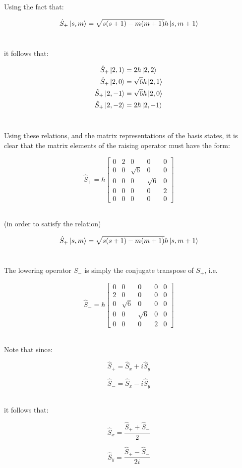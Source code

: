 \documentclass[9pt]{extarticle}
\begin{document}
\begin{multicols*}{2}
Using the fact that:

$$\hat S_+ \ket{s,m} = \sqrt{s(s+1) - m(m+1)} \hbar \ket{s,m+1}$$ \ 

it follows that:

$$
\begin{aligned}
	\hat S_+ \ket{2,1} &= 2 \hbar \ket{2,2} \\ 
	\hat S_+ \ket{2,0} &= \sqrt 6 \hbar \ket{2,1} \\ 
	\hat S_+ \ket{2,-1} &= \sqrt 6 \hbar \ket{2,0} \\ 
	\hat S_+ \ket{2,-2} &= 2 \hbar \ket{2,-1}
\end{aligned}
$$ \ 

Using these relations, and the matrix representations of the basis states, it is clear that the matrix elements of the raising operator must have the form:

$$
\hat S_+ = \hbar 
\begin{bmatrix}
	0 & 2 & 0 & 0 & 0 \\ 
	0 & 0 & \sqrt 6 & 0 & 0 \\ 
	0 & 0 & 0 & \sqrt 6 & 0 \\ 
	0 & 0 & 0 & 0 & 2 \\ 
	0 & 0 & 0 & 0 & 0
\end{bmatrix}
$$ \ 

(in order to satisfy the relation)

$$\hat S_+ \ket{s,m} = \sqrt{s(s+1) - m(m+1)} \hbar \ket{s,m+1}$$ \

The lowering operator $S_-$ is simply the conjugate transpose of $S_+$, i.e.

$$
\hat S_- = \hbar
\begin{bmatrix}
        0 & 0 & 0 & 0 & 0 \\
        2 & 0 & 0 & 0 & 0 \\
        0 & \sqrt 6 & 0 & 0 & 0 \\
        0 & 0 & \sqrt 6 & 0 & 0 \\
        0 & 0 & 0 & 2 & 0
\end{bmatrix}
$$ \

Note that since:

$$\hat S_+ = \hat S_x + i\hat S_y$$

$$\hat S_- = \hat S_x - i\hat S_y$$ \ 

it follows that:

$$\hat S_x = \frac{\hat S_+ + \hat S_-}{2}$$

$$\hat S_y = \frac{\hat S_+ - \hat S_-}{2i}$$ \ 


\end{multicols*}
\end{document}

